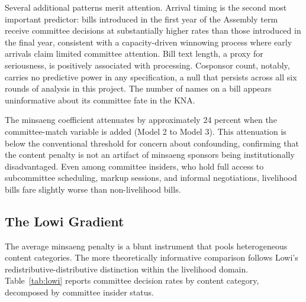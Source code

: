 \documentclass[11pt]{article}
\begin{document}
Several additional patterns merit attention. Arrival timing is the second most important predictor: bills introduced in the first year of the Assembly term receive committee decisions at substantially higher rates than those introduced in the final year, consistent with a capacity-driven winnowing process where early arrivals claim limited committee attention. Bill text length, a proxy for seriousness, is positively associated with processing. Cosponsor count, notably, carries no predictive power in any specification, a null that persists across all six rounds of analysis in this project. The number of names on a bill appears uninformative about its committee fate in the KNA.

The minsaeng coefficient attenuates by approximately 24 percent when the committee-match variable is added (Model 2 to Model 3). This attenuation is below the conventional threshold for concern about confounding, confirming that the content penalty is not an artifact of minsaeng sponsors being institutionally disadvantaged. Even among committee insiders, who hold full access to subcommittee scheduling, markup sessions, and informal negotiations, livelihood bills fare slightly worse than non-livelihood bills.

\subsection{The Lowi Gradient}

The average minsaeng penalty is a blunt instrument that pools heterogeneous content categories. The more theoretically informative comparison follows Lowi's redistributive-distributive distinction within the livelihood domain. Table~\ref{tab:lowi} reports committee decision rates by content category, decomposed by committee insider status.
\end{document}
